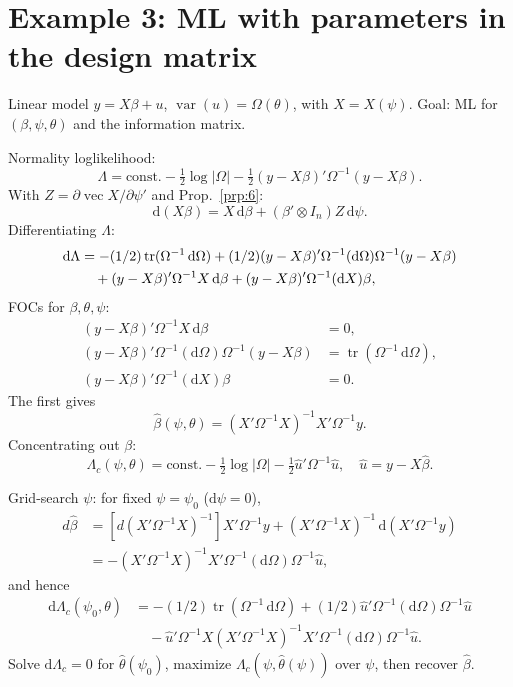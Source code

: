 \documentclass[14pt]{extarticle}
\theoremstyle{plain}
\theoremstyle{definition}
\theoremstyle{remark}
\DeclareMathOperator\var{var}
\DeclareMathOperator{\tr}{tr}
\DeclareMathOperator{\avec}{vec}
\newcommand{\dd}{\mathrm{d}}
\begin{document}
\section{Example 3: ML with parameters in the design matrix}\label{sec:14}

Linear model $y = X\beta + u$, $\var(u) = \Omega(\theta)$, with $X = X(\psi)$. Goal: ML for $(\beta, \psi, \theta)$ and the information matrix.

Normality loglikelihood:
\begin{equation}\label{eq:49}
\Lambda = \text{const.} - \tfrac{1}{2}\log|\Omega| - \tfrac{1}{2}(y - X\beta)'\Omega^{-1}(y - X\beta).
\end{equation}
With $Z = \partial\avec X/\partial\psi'$ and Prop.~\ref{prp:6}:
\[
\dd(X\beta) = X\, \dd\beta + (\beta' \otimes I_n)Z\, \dd\psi.
\]
Differentiating $\Lambda$:
\begin{align}\label{eq:50}
\dd\Lambda &= -(1/2)\tr(\Omega^{-1}\, \dd\Omega) + (1/2)(y - X\beta)'\Omega^{-1}(\dd\Omega)\Omega^{-1}(y - X\beta) \notag \\
&\quad + (y - X\beta)'\Omega^{-1}X\, \dd\beta + (y - X\beta)'\Omega^{-1}(\dd X)\beta,
\end{align}
FOCs for $\beta, \theta, \psi$:
\begin{align*}
(y - X\beta)'\Omega^{-1}X\, \dd\beta &= 0, \\
(y - X\beta)'\Omega^{-1}(\dd\Omega)\Omega^{-1}(y - X\beta) &= \tr(\Omega^{-1}\, \dd\Omega), \\
(y - X\beta)'\Omega^{-1}(\dd X)\beta &= 0.
\end{align*}
The first gives
\begin{equation}\label{eq:51}
\hat{\beta}(\psi, \theta) = (X'\Omega^{-1}X)^{-1}X'\Omega^{-1}y.
\end{equation}
Concentrating out $\beta$:
\[
\Lambda_c(\psi, \theta) = \text{const.} - \tfrac{1}{2}\log|\Omega| - \tfrac{1}{2}\hat{u}'\Omega^{-1}\hat{u}, \quad \hat u = y - X\hat\beta.
\]

Grid-search $\psi$: for fixed $\psi = \psi_0$ ($\dd\psi = 0$),
\begin{align*}
d\hat{\beta} &= [d(X'\Omega^{-1}X)^{-1}]X'\Omega^{-1}y + (X'\Omega^{-1}X)^{-1}\, \dd(X'\Omega^{-1}y) \\
&= -(X'\Omega^{-1}X)^{-1}X'\Omega^{-1}(\dd\Omega)\Omega^{-1}\hat{u},
\end{align*}
and hence
\begin{align*}
\dd\Lambda_c(\psi_0, \theta) &= -(1/2)\tr(\Omega^{-1}\, \dd\Omega) + (1/2)\hat{u}'\Omega^{-1}(\dd\Omega)\Omega^{-1}\hat{u} \\
&\quad - \hat{u}'\Omega^{-1}X(X'\Omega^{-1}X)^{-1}X'\Omega^{-1}(\dd\Omega)\Omega^{-1}\hat{u}.
\end{align*}
Solve $\dd\Lambda_c = 0$ for $\hat\theta(\psi_0)$, maximize $\Lambda_c(\psi, \hat\theta(\psi))$ over $\psi$, then recover $\hat\beta$.
\end{document}
